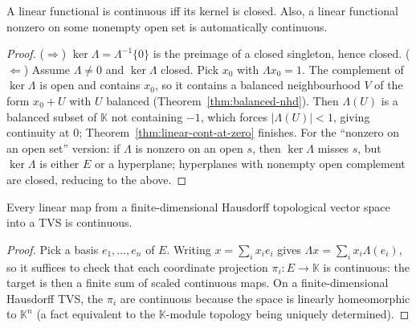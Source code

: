 \begin{theorem}
  \label{thm:linear-cont-iff-closed-ker}
  \leanok
  A linear functional is continuous iff its kernel is closed. Also, a
  linear functional nonzero on some nonempty open set is automatically
  continuous.
\end{theorem}
\begin{proof}
  \leanok
  ($\Rightarrow$) $\ker \Lambda = \Lambda^{-1}\{0\}$ is the preimage of a
  closed singleton, hence closed.
  ($\Leftarrow$) Assume $\Lambda \neq 0$ and $\ker \Lambda$ closed. Pick
  $x_0$ with $\Lambda x_0 = 1$. The complement of $\ker \Lambda$ is open
  and contains $x_0$, so it contains a balanced neighbourhood $V$ of the
  form $x_0 + U$ with $U$ balanced (Theorem~\ref{thm:balanced-nhd}).
  Then $\Lambda(U)$ is a balanced subset of $\mathbb{K}$ not containing
  $-1$, which forces $|\Lambda(U)| < 1$, giving continuity at $0$;
  Theorem~\ref{thm:linear-cont-at-zero} finishes.
  For the ``nonzero on an open set'' version: if $\Lambda$ is nonzero on
  an open $s$, then $\ker \Lambda$ misses $s$, but $\ker \Lambda$ is
  either $E$ or a hyperplane; hyperplanes with nonempty open complement
  are closed, reducing to the above.
\end{proof}

\begin{theorem}
  \label{thm:fd-linear-continuous}
  \leanok
  Every linear map from a finite-dimensional Hausdorff topological
  vector space into a TVS is continuous.
\end{theorem}
\begin{proof}
  \leanok
  Pick a basis $e_1, \ldots, e_n$ of $E$. Writing $x = \sum_i x_i e_i$
  gives $\Lambda x = \sum_i x_i \Lambda(e_i)$, so it suffices to check
  that each coordinate projection $\pi_i\colon E \to \mathbb{K}$ is
  continuous: the target is then a finite sum of scaled continuous maps.
  On a finite-dimensional Hausdorff TVS, the $\pi_i$ are continuous
  because the space is linearly homeomorphic to $\mathbb{K}^n$ (a fact
  equivalent to the $\mathbb{K}$-module topology being uniquely
  determined).
\end{proof}


